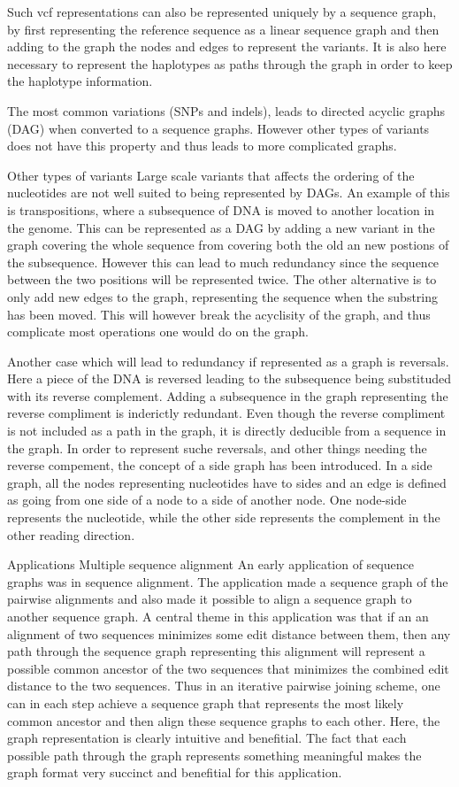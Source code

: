 Such vcf representations can also be represented uniquely by a sequence graph, by first representing the reference sequence as  a linear sequence graph and then adding to the graph the nodes and edges to represent the variants. It is also here necessary to represent the haplotypes as paths through the graph in order to keep the haplotype information.

The most common variations (SNPs and indels), leads to directed acyclic graphs (DAG) when converted to a sequence graphs. However other types of variants does not have this property and thus leads to more complicated graphs. 

Other types of variants
Large scale variants that affects the ordering of the nucleotides are not well suited to being represented by DAGs. An example of this is transpositions, where a subsequence of DNA is moved to another location in the genome. This can be represented as a DAG by adding a new variant in the graph covering the whole sequence from covering both the old an new postions of  the subsequence. However this can lead to much redundancy since the sequence between the two positions will be represented twice. The other alternative is to only add new edges to the graph, representing the sequence when the substring has been moved. This will however break the acyclisity of the graph, and thus complicate most operations one would do on the graph. 

Another case which will lead to redundancy if represented as a graph is reversals. Here a piece of the DNA is reversed leading to the subsequence being substituded with its reverse complement. Adding a subsequence in the graph representing the reverse compliment is inderictly redundant. Even though the reverse compliment is not included as a path in the graph, it is directly deducible from a sequence in the graph. In order to represent suche reversals, and other things needing the reverse compement, the concept of a side graph has been introduced. In a side graph, all the nodes representing nucleotides have to sides and an edge is defined as going from one side of a node to a side of another node. One node-side represents the nucleotide, while the other side represents the complement in the other reading direction. 

Applications
Multiple sequence alignment
An early application of sequence graphs was in sequence alignment. The application made a sequence graph of the pairwise alignments and also made it possible to align a sequence graph to another sequence graph. A central theme in this application was that if an an alignment of two sequences minimizes some edit distance between them, then any path through the sequence graph representing this alignment will represent a possible common ancestor of the two sequences that minimizes the combined edit distance to the two sequences. Thus in an iterative pairwise joining scheme, one can in each step achieve a sequence graph that represents the most likely common ancestor and then align these sequence graphs to each other. Here, the graph representation is clearly intuitive and benefitial. The fact that each possible path through the graph represents something meaningful makes the graph format very succinct and benefitial for this application. 


